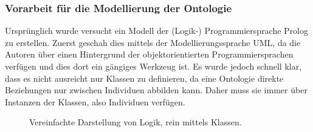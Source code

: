 \subsubsection{Vorarbeit für die Modellierung der Ontologie}
\label{sub:modellierung_der_ontologie_vorarbeit}
Ursprünglich wurde versucht ein Modell der (Logik-) Programmiersprache Prolog zu erstellen. Zuerst geschah dies mittels der Modellierungssprache UML, da die Autoren über einen Hintergrund der objektorientierten Programmiersprachen verfügen und dies dort ein gängiges Werkzeug ist. Es wurde jedoch schnell klar, dass es nicht ausreicht nur Klassen zu definieren, da eine Ontologie direkte Beziehungen nur zwischen Individuen abbilden kann. Daher muss sie immer über Instanzen der Klassen, also Individuen verfügen.

\begin{figure}[H]
\centering {}
\caption{Vereinfachte Darstellung von Logik, rein mittels Klassen.\label{fig:prolog_logik_baum}\protect\footnotemark}
\end{figure}

